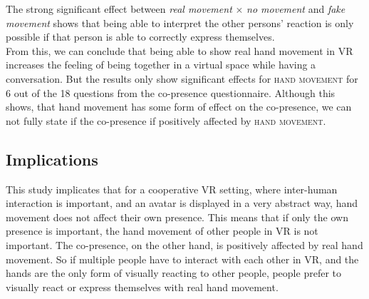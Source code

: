 \documentclass[english,runningheads,a4paper]{llncs}[2018/03/10]
\begin{document}
The strong significant effect between \textit{real movement} $\times$ \textit{no movement} and \textit{fake movement} shows that being able to interpret the other persons' reaction is only possible if that person is able to correctly express themselves. \\ \linebreak
From this, we can conclude that being able to show real hand movement in VR increases the feeling of being together in a virtual space while having a conversation.
But the results only show significant effects for \textsc{hand movement} for 6 out of the 18 questions from the co-presence questionnaire.
Although this shows, that hand movement has some form of effect on the co-presence, we can not fully state if the co-presence if positively affected by \textsc{hand movement}.



\subsection{Implications}
This study implicates that for a cooperative VR setting, where inter-human interaction is important, and an avatar is displayed in a very abstract way, hand movement does not affect their own presence.
This means that if only the own presence is important, the hand movement of other people in VR is not important.
The co-presence, on the other hand, is positively affected by real hand movement. 
So if multiple people have to interact with each other in VR, and the hands are the only form of visually reacting to other people, people prefer to visually react or express themselves with real hand movement.
\end{document}
